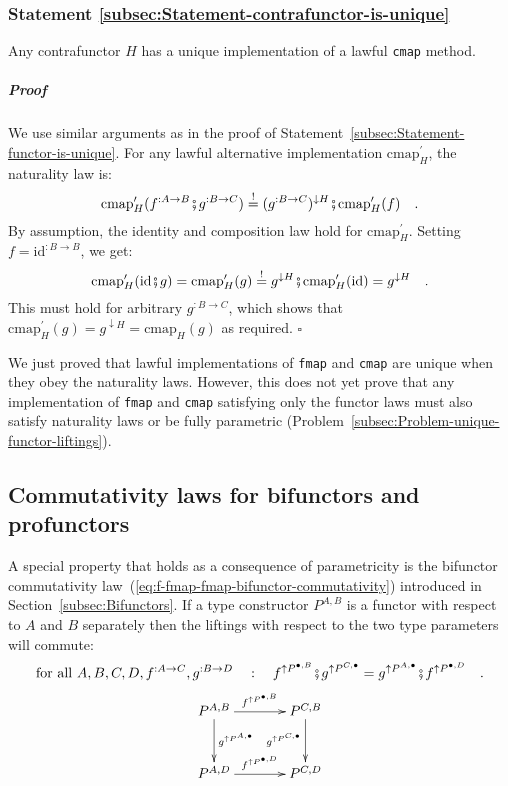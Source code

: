 \subsubsection{Statement \label{subsec:Statement-contrafunctor-is-unique}\ref{subsec:Statement-contrafunctor-is-unique}}

Any contrafunctor $H$ has a unique implementation of a lawful \lstinline!cmap!
method. 

\subparagraph{Proof}

We use similar arguments as in the proof of Statement~\ref{subsec:Statement-functor-is-unique}.
For any lawful alternative implementation $\text{cmap}_{H}^{\prime}$,
the naturality law is:
\[
\text{cmap}_{H}^{\prime}(f^{:A\rightarrow B}\bef g^{:B\rightarrow C})\overset{!}{=}(g^{:B\rightarrow C})^{\downarrow H}\bef\text{cmap}_{H}^{\prime}(f)\quad.
\]
By assumption, the identity and composition law hold for $\text{cmap}_{H}^{\prime}$.
Setting $f=\text{id}^{:B\rightarrow B}$, we get:
\[
\text{cmap}_{H}^{\prime}(\text{id}\bef g)=\text{cmap}_{H}^{\prime}(g)\overset{!}{=}g^{\downarrow H}\bef\text{cmap}_{H}^{\prime}(\text{id})=g^{\downarrow H}\quad.
\]
This must hold for arbitrary $g^{:B\rightarrow C}$, which shows that
$\text{cmap}_{H}^{\prime}(g)=g^{\downarrow H}=\text{cmap}_{H}(g)$
as required. $\square$

We just proved that lawful implementations of \lstinline!fmap! and
\lstinline!cmap! are unique when they obey the naturality laws. However,
this does not yet prove that any implementation of \lstinline!fmap!
and \lstinline!cmap! satisfying only the functor laws must also satisfy
naturality laws or be fully parametric (Problem~\ref{subsec:Problem-unique-functor-liftings}).

\subsection{Commutativity laws for bifunctors and profunctors\label{sec:Commutativity-laws-for-type-constructors}}

A special property that holds as a consequence of parametricity is
the bifunctor commutativity law~(\ref{eq:f-fmap-fmap-bifunctor-commutativity})
introduced in Section~\ref{subsec:Bifunctors}. If a type constructor
$P^{A,B}$ is a functor with respect to $A$ and $B$ separately then
the liftings with respect to the two type parameters will commute:
\[
\text{for all }A,B,C,D,f^{:A\rightarrow C},g^{:B\rightarrow D}\quad:\quad f^{\uparrow P^{\bullet,B}}\bef g^{\uparrow P^{C,\bullet}}=g^{\uparrow P^{A,\bullet}}\bef f^{\uparrow P^{\bullet,D}}\quad.
\]
\[
\xymatrix{\xyScaleY{2.5pc}\xyScaleX{3.0pc}P^{A,B}\ar[r]\sp(0.5){f^{\uparrow P^{\bullet,B}}}\ar[d]\sp(0.45){g^{\uparrow P^{A,\bullet}}} & P^{C,B}\ar[d]\sb(0.45){g^{\uparrow P^{C,\bullet}}}\\
P^{A,D}\ar[r]\sp(0.5){f^{\uparrow P^{\bullet,D}}} & P^{C,D}
}
\]

